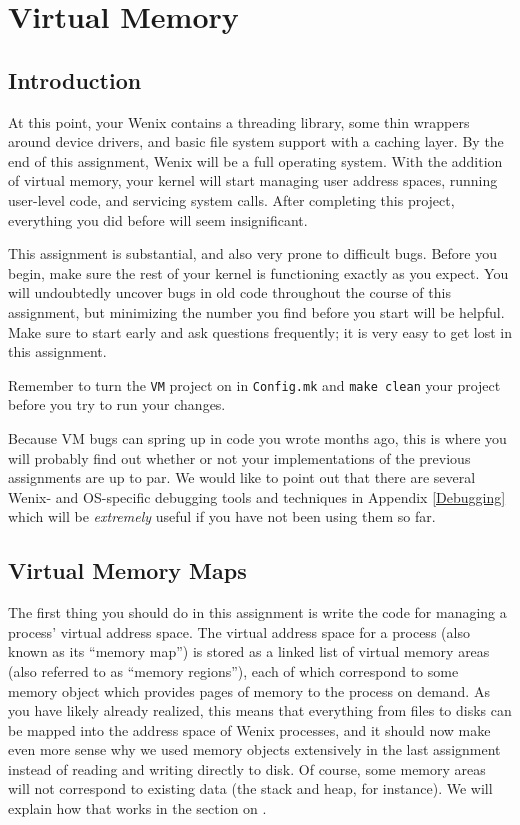 \chapter{Virtual Memory}
\label{vm}

\section{Introduction}

At this point, your Wenix contains a threading library, some thin wrappers around device drivers, and basic file system support with a caching layer. By the end of this assignment, Wenix will be a full operating system. With the addition of virtual memory, your kernel will start managing user address spaces, running user-level code, and servicing system calls. After completing this project, everything you did before will seem insignificant.

This assignment is substantial, and also very prone to difficult bugs. Before you begin, make sure the rest of your kernel is functioning exactly as you expect. You will undoubtedly uncover bugs in old code throughout the course of this assignment, but minimizing the number you find before you start will be helpful. Make sure to start early and ask questions frequently; it is very easy to get lost in this assignment.

Remember to turn the \texttt{VM} project on in \texttt{Config.mk} and \texttt{make clean} your project before you try to run your changes.

Because VM bugs can spring up in code you wrote months ago, this is where you will probably find out whether or not your implementations of the previous assignments are up to par. We would like to point out that there are several Wenix- and OS-specific debugging tools and techniques in Appendix \ref{Debugging} which will be \textit{extremely} useful if you have not been using them so far.

\section{Virtual Memory Maps}

The first thing you should do in this assignment is write the code for managing a process' virtual address space. The virtual address space for a process (also known as its ``memory map'') is stored as a linked list of virtual memory areas (also referred to as ``memory regions''), each of which correspond to some memory object which provides pages of memory to the process on demand. As you have likely already realized, this means that everything from files to disks can be mapped into the address space of Wenix processes, and it should now make even more sense why we used memory objects extensively in the last assignment instead of reading and writing directly to disk. Of course, some memory areas will not correspond to existing data (the stack and heap, for instance). We will explain how that works in the section on .

